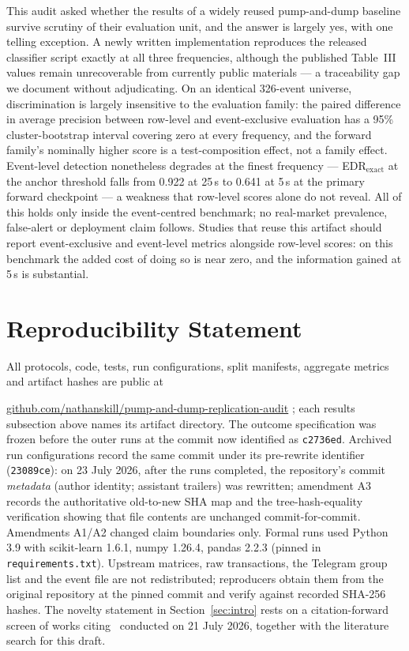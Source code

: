 \documentclass[runningheads]{llncs}
\newif\ifanonymous
\newcommand{\repolink}{%
\ifanonymous
[link redacted for review; artifacts available to reviewers on request]%
\else
\url{github.com/nathanskill/pump-and-dump-replication-audit}%
\fi}
\begin{document}
This audit asked whether the results of a widely reused pump-and-dump
baseline survive scrutiny of their evaluation unit, and the answer is
largely yes, with one telling exception. A newly written implementation
reproduces the released classifier script exactly at all three
frequencies, although the published Table~III values remain
unrecoverable from currently public materials --- a traceability gap we
document without adjudicating. On an identical 326-event universe,
discrimination is largely insensitive to the evaluation family: the
paired difference in average precision between row-level and
event-exclusive evaluation has a 95\% cluster-bootstrap interval
covering zero at every frequency, and the forward family's nominally
higher score is a test-composition effect, not a family effect.
Event-level detection nonetheless degrades at the finest frequency ---
EDR$_{\mathrm{exact}}$ at the anchor threshold falls from 0.922 at
25\,s to 0.641 at 5\,s at the primary forward checkpoint --- a weakness
that row-level scores alone do not reveal. All of this holds only
inside the event-centred benchmark; no real-market prevalence,
false-alert or deployment claim follows. Studies that reuse this
artifact should report event-exclusive and event-level metrics
alongside row-level scores: on this benchmark the added cost of doing
so is near zero, and the information gained at 5\,s is substantial.

\section{Reproducibility Statement}\label{sec:repro}

All protocols, code, tests, run configurations, split manifests,
aggregate metrics and artifact hashes are public at \repolink; each
results subsection above names its artifact directory. The outcome
specification was frozen before the outer runs at the commit now
identified as \texttt{c2736ed}. Archived run configurations record the
same commit under its pre-rewrite identifier (\texttt{23089ce}): on 23
July 2026, after the runs completed, the repository's commit
\emph{metadata} (author identity; assistant trailers) was rewritten;
amendment A3 records the authoritative old-to-new SHA map and the
tree-hash-equality verification showing that file contents are
unchanged commit-for-commit. Amendments A1/A2 changed claim boundaries
only. Formal runs used Python 3.9 with scikit-learn 1.6.1, numpy
1.26.4, pandas 2.2.3 (pinned in \texttt{requirements.txt}). Upstream
matrices, raw transactions, the Telegram group list and the event file
are not redistributed; reproducers obtain them from the original
repository at the pinned commit and verify against recorded SHA-256
hashes. The novelty statement in Section~\ref{sec:intro} rests on a
citation-forward screen of works citing~\cite{LaMorgia2020} conducted
on 21 July 2026, together with the literature search for this draft.
\end{document}
